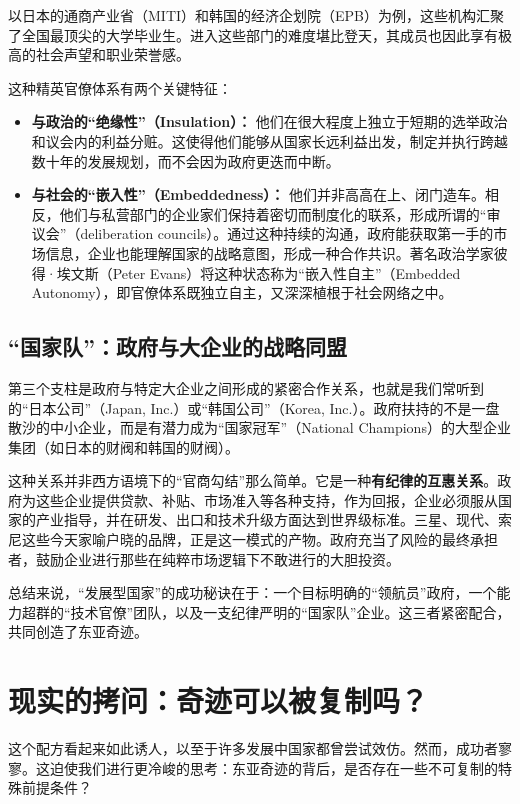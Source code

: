 \documentclass[a5paper, 11pt, openany]{ctexbook}
\begin{document}
以日本的通商产业省（MITI）和韩国的经济企划院（EPB）为例，这些机构汇聚了全国最顶尖的大学毕业生。进入这些部门的难度堪比登天，其成员也因此享有极高的社会声望和职业荣誉感。

这种精英官僚体系有两个关键特征：
\begin{itemize}
    \item \textbf{与政治的“绝缘性”（Insulation）：} 他们在很大程度上独立于短期的选举政治和议会内的利益分赃。这使得他们能够从国家长远利益出发，制定并执行跨越数十年的发展规划，而不会因为政府更迭而中断。
    \item \textbf{与社会的“嵌入性”（Embeddedness）：} 他们并非高高在上、闭门造车。相反，他们与私营部门的企业家们保持着密切而制度化的联系，形成所谓的“审议会”（deliberation councils）。通过这种持续的沟通，政府能获取第一手的市场信息，企业也能理解国家的战略意图，形成一种合作共识。著名政治学家彼得·埃文斯（Peter Evans）将这种状态称为“嵌入性自主”（Embedded Autonomy），即官僚体系既独立自主，又深深植根于社会网络之中。
\end{itemize}

\subsection{“国家队”：政府与大企业的战略同盟}

第三个支柱是政府与特定大企业之间形成的紧密合作关系，也就是我们常听到的“日本公司”（Japan, Inc.）或“韩国公司”（Korea, Inc.）。政府扶持的不是一盘散沙的中小企业，而是有潜力成为“国家冠军”（National Champions）的大型企业集团（如日本的财阀和韩国的财阀）。

这种关系并非西方语境下的“官商勾结”那么简单。它是一种\textbf{有纪律的互惠关系}。政府为这些企业提供贷款、补贴、市场准入等各种支持，作为回报，企业必须服从国家的产业指导，并在研发、出口和技术升级方面达到世界级标准。三星、现代、索尼这些今天家喻户晓的品牌，正是这一模式的产物。政府充当了风险的最终承担者，鼓励企业进行那些在纯粹市场逻辑下不敢进行的大胆投资。

总结来说，“发展型国家”的成功秘诀在于：一个目标明确的“领航员”政府，一个能力超群的“技术官僚”团队，以及一支纪律严明的“国家队”企业。这三者紧密配合，共同创造了东亚奇迹。

\section{现实的拷问：奇迹可以被复制吗？}

这个配方看起来如此诱人，以至于许多发展中国家都曾尝试效仿。然而，成功者寥寥。这迫使我们进行更冷峻的思考：东亚奇迹的背后，是否存在一些不可复制的特殊前提条件？
\end{document}
